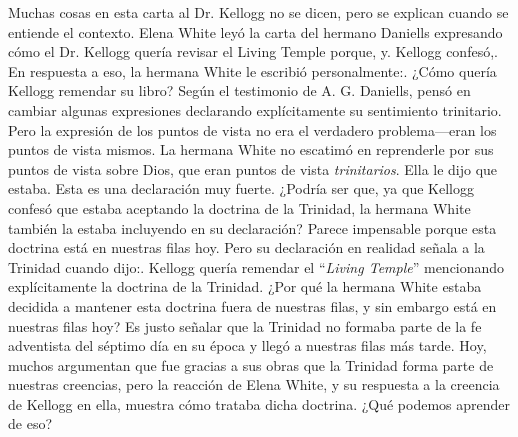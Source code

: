 Muchas cosas en esta carta al Dr. Kellogg no se dicen, pero se explican cuando se entiende el contexto. Elena White leyó la carta del hermano Daniells expresando cómo el Dr. Kellogg quería revisar el Living Temple porque, y. Kellogg confesó,. En respuesta a eso, la hermana White le escribió personalmente:. ¿Cómo quería Kellogg remendar su libro? Según el testimonio de A. G. Daniells, pensó en cambiar algunas expresiones declarando explícitamente su sentimiento trinitario. Pero la expresión de los puntos de vista no era el verdadero problema—eran los puntos de vista mismos. La hermana White no escatimó en reprenderle por sus puntos de vista sobre Dios, que eran puntos de vista \textit{trinitarios}. Ella le dijo que estaba. Esta es una declaración muy fuerte. ¿Podría ser que, ya que Kellogg confesó que estaba aceptando la doctrina de la Trinidad, la hermana White también la estaba incluyendo en su declaración? Parece impensable porque esta doctrina está en nuestras filas hoy. Pero su declaración en realidad señala a la Trinidad cuando dijo:. Kellogg quería remendar el “\textit{Living Temple}” mencionando explícitamente la doctrina de la Trinidad. ¿Por qué la hermana White estaba decidida a mantener esta doctrina fuera de nuestras filas, y sin embargo está en nuestras filas hoy? Es justo señalar que la Trinidad no formaba parte de la fe adventista del séptimo día en su época y llegó a nuestras filas más tarde. Hoy, muchos argumentan que fue gracias a sus obras que la Trinidad forma parte de nuestras creencias, pero la reacción de Elena White, y su respuesta a la creencia de Kellogg en ella, muestra cómo trataba dicha doctrina. ¿Qué podemos aprender de eso?


